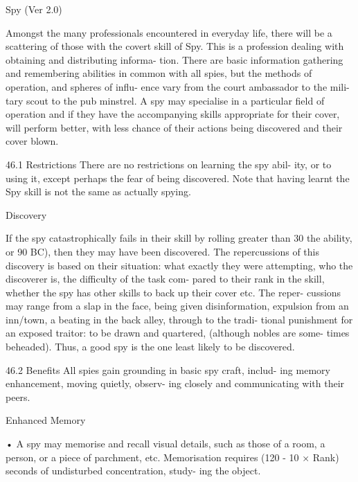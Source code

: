 \begin{Chapter}{Spy (Ver 2.0)}

Amongst  the  many  professionals  encountered  in 
everyday  life,  there  will  be  a  scattering  of  those 
with  the  covert  skill  of  Spy.  This  is  a  profession 
dealing  with  obtaining  and  distributing  informa-
tion.  There  are  basic  information  gathering  and 
remembering  abilities  in  common  with  all  spies, 
but the methods of operation, and spheres of influ-
ence  vary  from  the  court  ambassador  to  the  mili-
tary scout to the pub minstrel. A spy may specialise 
in  a  particular  field  of  operation  and  if  they  have 
the  accompanying  skills  appropriate  for  their 
cover, will perform better, with less chance of their 
actions being discovered and their cover blown. 

46.1 Restrictions 
There  are  no  restrictions  on  learning  the  spy  abil-
ity, or to using it, except perhaps the fear of being 
discovered. Note that having learnt the Spy skill is 
not the same as actually spying. 

Discovery 

If  the  spy  catastrophically  fails  in  their  skill  by 
rolling  greater  than  30%
the ability, or 90%
BC),  then  they  may  have  been  discovered.  The 
repercussions  of  this  discovery  is  based  on  their 
situation:  what  exactly  they  were  attempting,  who 
the  discoverer  is,  the  difficulty  of  the  task  com-
pared to their rank in the skill, whether the spy has 
other  skills  to  back  up  their  cover  etc.  The  reper-
cussions  may  range  from  a  slap  in  the  face,  being 
given  disinformation,  expulsion  from  an  inn/town, 
a  beating  in  the  back  alley,  through  to  the  tradi-
tional  punishment  for  an  exposed  traitor:  to  be 
drawn  and  quartered,  (although  nobles  are  some-
times beheaded). Thus, a good spy is the one least 
likely to be discovered. 

46.2 Benefits 
All spies gain grounding in basic spy craft, includ-
ing memory enhancement, moving quietly, observ-
ing closely and communicating with their peers. 

Enhanced Memory  

•  A  spy  may  memorise  and  recall  visual  details, 
such  as  those  of  a  room,  a  person,  or  a  piece  of 
parchment, etc. Memorisation requires (120 - 10 × 
Rank) seconds of undisturbed concentration, study-
ing the object.  


\end{Chapter}
